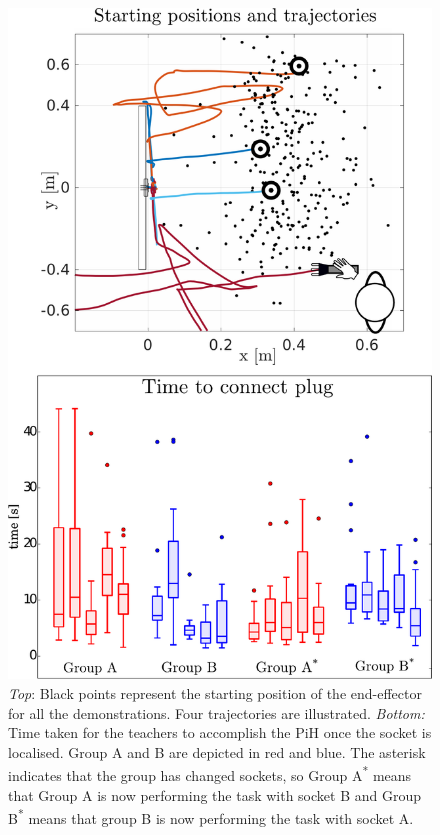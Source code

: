 \begin{figure}
 \centering
   \includegraphics[width=\textwidth]{./ch4-PiH/Figures/Fig/start_position_v2.pdf}
   \caption{\textit{Top}: Black points represent the starting position of the end-effector
   for all the demonstrations. Four trajectories are illustrated. \textit{Bottom:} 
   Time taken for the teachers to accomplish the PiH once the socket is localised. Group A and B are depicted in red 
   and blue. The asterisk indicates that the group has changed sockets, so Group A\textsuperscript{*} means
   that Group A is now performing the task with socket B and Group B\textsuperscript{*} means that group B is now performing 
   the task with socket A.}
  \label{fig:experiment_setup_data}
\end{figure}

